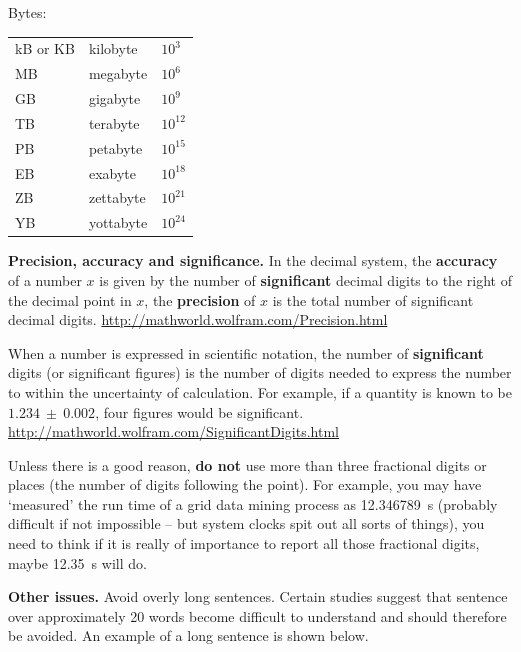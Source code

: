 \documentclass{newseye_del}
\begin{document}
Bytes:\\
\begin{tabular}{lll}
    kB or KB & kilobyte & $10^3$ \\
    MB & megabyte & $10^6$ \\
    GB & gigabyte & $10^9$ \\
    TB & terabyte & $10^{12}$ \\
    PB & petabyte & $10^{15}$ \\
    EB & exabyte & $10^{18}$ \\
    ZB & zettabyte & $10^{21}$ \\
    YB & yottabyte & $10^{24}$ \\
\end{tabular}

\textbf{Precision, accuracy and significance.} In the decimal system, the
\textbf{accuracy} of a number $x$ is given by the number of \textbf{significant}
decimal digits to the right of the decimal point in $x$, the \textbf{precision}
of $x$ is the total number of significant decimal digits.
\url{http://mathworld.wolfram.com/Precision.html}

When a number is expressed in scientific notation, the number of
\textbf{significant} digits (or significant figures) is the number of digits
needed to express the number to within the uncertainty of calculation. For
example, if a quantity is known to be $1.234 ~ \pm ~ 0.002$, four figures would
be significant. \url{http://mathworld.wolfram.com/SignificantDigits.html}

Unless there is a good reason, \textbf{do not} use more than three fractional
digits or places (the number of digits following the point). For example, you
may have `measured' the run time of a grid data mining process as 12.346789~s
(probably difficult if not impossible -- but system clocks spit out all sorts of
things), you need to think if it is really of importance to report all those
fractional digits, maybe 12.35~s will do.

\textbf{Other issues.} Avoid overly long sentences. Certain studies suggest that
sentence over approximately 20 words become difficult to understand and should
therefore be avoided. An example of a long sentence is shown below.
\end{document}

